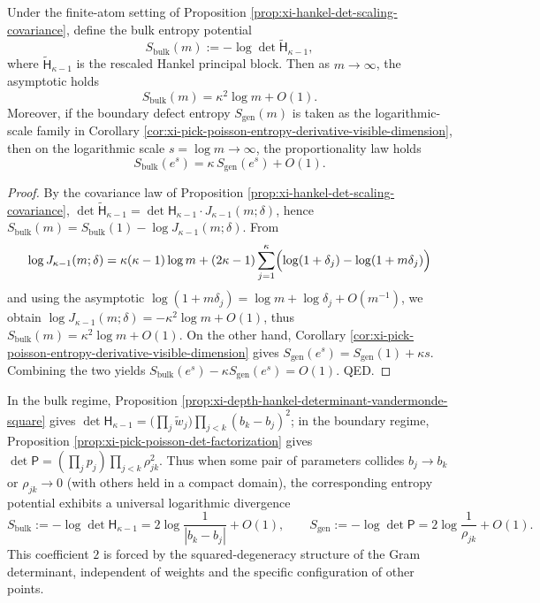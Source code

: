 
\begin{corollary}\label{cor:xi-bulk-boundary-double-scaling-holography}
Under the finite-atom setting of Proposition \ref{prop:xi-hankel-det-scaling-covariance}, define the bulk entropy potential
\[
S_{\mathrm{bulk}}(m):=-\log\det \widetilde{\mathsf H}_{\kappa-1},
\]
where \(\widetilde{\mathsf H}_{\kappa-1}\) is the rescaled Hankel principal block.
Then as \(m\to\infty\), the asymptotic holds
\[
\boxed{\;
S_{\mathrm{bulk}}(m)=\kappa^2\log m+O(1).\;}
\]
Moreover, if the boundary defect entropy \(S_{\mathrm{gen}}(m)\) is taken as the logarithmic-scale family in Corollary \ref{cor:xi-pick-poisson-entropy-derivative-visible-dimension}, then on the logarithmic scale \(s=\log m\to\infty\), the proportionality law holds
\[
\boxed{\;
S_{\mathrm{bulk}}(e^{s})=\kappa\,S_{\mathrm{gen}}(e^{s})+O(1).\;}
\]
\end{corollary}
\begin{proof}
By the covariance law of Proposition \ref{prop:xi-hankel-det-scaling-covariance},
\(
\det \widetilde{\mathsf H}_{\kappa-1}=\det \mathsf H_{\kappa-1}\cdot J_{\kappa-1}(m;\delta)
\),
hence
\(
S_{\mathrm{bulk}}(m)=S_{\mathrm{bulk}}(1)-\log J_{\kappa-1}(m;\delta)
\).
From
\[
\log J_{\kappa-1}(m;\delta)
=\kappa(\kappa-1)\log m
+(2\kappa-1)\sum_{j=1}^{\kappa}\Bigl(\log(1+\delta_j)-\log(1+m\delta_j)\Bigr)
\]
and using the asymptotic \(\log(1+m\delta_j)=\log m+\log\delta_j+O(m^{-1})\), we obtain
\(
\log J_{\kappa-1}(m;\delta)=-\kappa^2\log m+O(1)
\),
thus
\(
S_{\mathrm{bulk}}(m)=\kappa^2\log m+O(1)
\).
On the other hand, Corollary \ref{cor:xi-pick-poisson-entropy-derivative-visible-dimension} gives
\(
S_{\mathrm{gen}}(e^s)=S_{\mathrm{gen}}(1)+\kappa s
\).
Combining the two yields
\(
S_{\mathrm{bulk}}(e^s)-\kappa S_{\mathrm{gen}}(e^s)=O(1)
\). QED.
\end{proof}

\begin{remark}\label{rem:xi-collision-universal-exponent-two}
In the bulk regime, Proposition \ref{prop:xi-depth-hankel-determinant-vandermonde-square} gives
\(
\det \mathsf H_{\kappa-1}
=\bigl(\prod_j\widetilde w_j\bigr)\prod_{j<k}(b_k-b_j)^2
\);
in the boundary regime, Proposition \ref{prop:xi-pick-poisson-det-factorization} gives
\(
\det\mathsf P=(\prod_j p_j)\prod_{j<k}\rho_{jk}^2
\).
Thus when some pair of parameters collides \(b_j\to b_k\) or \(\rho_{jk}\to 0\) (with others held in a compact domain),
the corresponding entropy potential exhibits a universal logarithmic divergence
\[
S_{\mathrm{bulk}}
:=-\log\det \mathsf H_{\kappa-1}
=2\log\frac{1}{|b_k-b_j|}+O(1),
\qquad
S_{\mathrm{gen}}
:=-\log\det\mathsf P
=2\log\frac{1}{\rho_{jk}}+O(1).
\]
This coefficient \(2\) is forced by the squared-degeneracy structure of the Gram determinant, independent of weights and the specific configuration of other points.
\end{remark}
